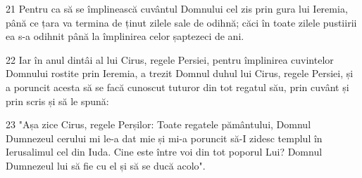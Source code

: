 \par 21 Pentru ca să se împlinească cuvântul Domnului cel zis prin gura lui Ieremia, până ce țara va termina de ținut zilele sale de odihnă; căci în toate zilele pustiirii ea s-a odihnit până la împlinirea celor șaptezeci de ani.
\par 22 Iar în anul dintâi al lui Cirus, regele Persiei, pentru împlinirea cuvintelor Domnului rostite prin Ieremia, a trezit Domnul duhul lui Cirus, regele Persiei, și a poruncit acesta să se facă cunoscut tuturor din tot regatul său, prin cuvânt și prin scris și să le spună:
\par 23 "Așa zice Cirus, regele Perșilor: Toate regatele pământului, Domnul Dumnezeul cerului mi le-a dat mie și mi-a poruncit să-I zidesc templul în Ierusalimul cel din Iuda. Cine este între voi din tot poporul Lui? Domnul Dumnezeul lui să fie cu el și să se ducă acolo".


